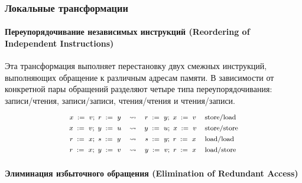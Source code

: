 \subsubsection{Локальные трансформации}

\paragraph{
Переупорядочивание независимых инструкций
(Reordering of Independent Instructions)
} 

Эта трансформация выполняет перестановку 
двух смежных инструкций, выполняющих обращение к 
различным адресам памяти. 
В зависимости от конкретной пары обращений разделяют 
четыре типа переупорядочивания:
записи/чтения, записи/записи,
чтения/чтения и чтения/записи. 
%
\[\def\arraystretch{1.4}\footnotesize
  \begin{array}{cccl} 

      \writeInst{}{x}{v} \seq \readInst{}{r}{y} 
    & \leadsto 
    & \readInst{}{r}{y} \seq \writeInst{}{x}{v}
    & \text{store/load}  \\ 

      \writeInst{}{x}{v} \seq \writeInst{}{y}{u} 
    & \leadsto 
    & \writeInst{}{y}{u} \seq \writeInst{}{x}{v}
    & \text{store/store}  \\ 

      \readInst{}{r}{x} \seq \readInst{}{s}{y} 
    & \leadsto 
    & \readInst{}{s}{y} \seq \readInst{}{r}{x}
    & \text{load/load}  \\ 

      \readInst{}{r}{x} \seq \writeInst{}{y}{v} 
    & \leadsto 
    & \writeInst{}{y}{v} \seq \readInst{}{r}{x}
    & \text{load/store}  \\ 

  \end{array}
\]

\paragraph{
Элиминация избыточного обращения
(Elimination of Redundant Access)
} 

